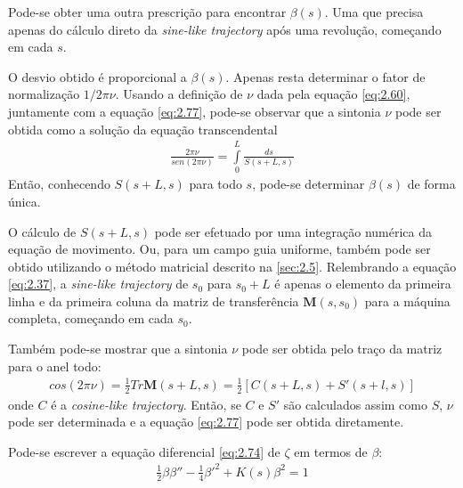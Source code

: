 Pode-se obter uma outra prescrição para encontrar $\beta(s)$. Uma que precisa apenas do cálculo direto da \textit{sine-like trajectory} após uma revolução, começando em cada $s$.

O desvio obtido é proporcional a $\beta(s)$. Apenas resta determinar o fator de normalização $1/2\pi\nu$. Usando a definição de $\nu$ dada pela equação \eqref{eq:2.60}, juntamente com a equação \eqref{eq:2.77}, pode-se observar que a sintonia $\nu$ pode ser obtida como a solução da equação transcendental
\begin{align}
	\frac{2\pi\nu}{sen(2\pi\nu)} = \int\limits_{0}^{L} \frac{ds}{S(s+L,s)}
\end{align}
Então, conhecendo $S(s+L,s)$ para todo $s$, pode-se determinar $\beta(s)$ de forma única.

O cálculo de $S(s+L,s)$ pode ser efetuado por uma integração numérica da equação de movimento. Ou, para um campo guia uniforme, também pode ser obtido utilizando o método matricial descrito na \autoref{sec:2.5}. Relembrando a equação \eqref{eq:2.37}, a \textit{sine-like trajectory} de $s_0$ para $s_0+L$ é apenas o elemento da primeira linha e da primeira coluna da matriz de transferência $\boldsymbol{M}(s,s_0)$ para a máquina completa, começando em cada $s_0$.

Também pode-se mostrar que a sintonia $\nu$ pode ser obtida pelo traço da matriz para o anel todo:
\begin{align}
	cos(2\pi\nu) = \frac{1}{2} Tr \boldsymbol{M}(s+L,s) = \frac{1}{2}[C(s+L,s) + S'(s+l,s)]
\end{align}
onde $C$ é a \textit{cosine-like trajectory}. Então, se $C$ e $S'$ são calculados assim como $S$, $\nu$ pode ser determinada e a equação \eqref{eq:2.77} pode ser obtida diretamente.

Pode-se escrever a equação diferencial \eqref{eq:2.74} de $\zeta$ em termos de $\beta$:
\begin{align}
	\frac{1}{2}\beta\beta'' - \frac{1}{4}\beta'^2 + K(s)\beta^2 = 1\label{eq:2.80}
\end{align}

